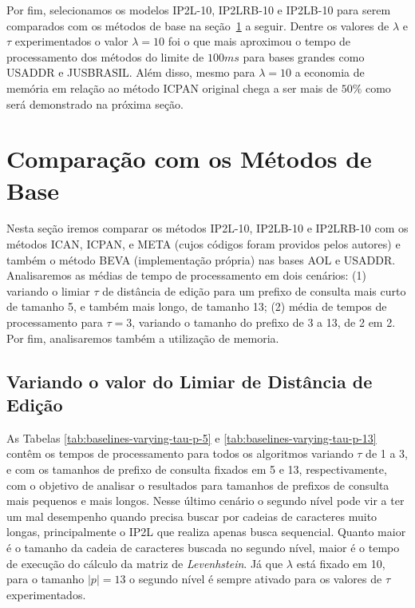 Por fim, selecionamos os modelos IP2L-10, IP2LRB-10 e IP2LB-10 para serem comparados com os métodos de base na seção~\ref{sec:comparison_baseline_methods} a seguir. Dentre os valores de $\lambda$ e $\tau$ experimentados o valor $\lambda=10$ foi o que mais aproximou o tempo de processamento dos métodos do limite de $100ms$ para bases grandes como USADDR e JUSBRASIL. Além disso, mesmo para $\lambda=10$ a economia de memória em relação ao método ICPAN original chega a ser mais de $50\%$ como será demonstrado na próxima seção.


\section{Comparação com os Métodos de Base}
\label{sec:comparison_baseline_methods}

Nesta seção iremos comparar os métodos IP2L-10, IP2LB-10 e IP2LRB-10 com os métodos ICAN, ICPAN, e META (cujos códigos foram providos pelos autores) e também o método BEVA (implementação própria) nas bases AOL e USADDR. Analisaremos as médias de tempo de processamento em dois cenários: (1) variando o limiar $\tau$ de distância de edição para um prefixo de consulta mais curto de tamanho 5, e também mais longo, de tamanho 13; (2) média de tempos de processamento para $\tau=3$, variando o tamanho do prefixo de 3 a 13, de 2 em 2. Por fim, analisaremos também a utilização de memoria.

\subsection{Variando o valor do Limiar de Distância de Edição}

As Tabelas \ref{tab:baselines-varying-tau-p-5} e \ref{tab:baselines-varying-tau-p-13} contêm os tempos de processamento para todos os algoritmos variando $\tau$ de 1 a 3, e com os tamanhos de prefixo de consulta fixados em 5 e 13, respectivamente, com o objetivo de analisar o resultados para tamanhos de prefixos de consulta mais pequenos e mais longos. Nesse último cenário o segundo nível pode vir a ter um mal desempenho quando precisa buscar por cadeias de caracteres muito longas, principalmente o IP2L que realiza apenas busca sequencial. Quanto maior é o tamanho da cadeia de caracteres buscada no segundo nível, maior é o tempo de execução do cálculo da matriz de \textit{Levenhstein}. Já que $\lambda$ está fixado em 10, para o tamanho $|p|=13$ o segundo nível é sempre ativado para os valores de $\tau$ experimentados.

